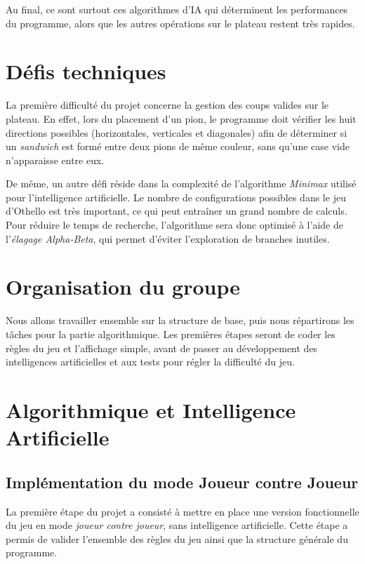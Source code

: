 \documentclass{article}
\begin{document}
Au final, ce sont surtout ces algorithmes d'IA qui déterminent les performances du programme, alors que les autres opérations sur le plateau restent très rapides.

\section{\textbf{Défis techniques}}

La première difficulté du projet concerne la gestion des coups valides sur le plateau. En effet, lors du placement d'un pion, le programme doit vérifier les huit directions possibles (horizontales, verticales et diagonales) afin de déterminer si un \emph{sandwich} est formé entre deux pions de même couleur, sans qu'une case vide n'apparaisse entre eux.

De même, un autre défi réside dans la complexité de l'algorithme \emph{Minimax} utilisé pour l'intelligence artificielle. Le nombre de configurations possibles dans le jeu d'Othello est très important, ce qui peut entraîner un grand nombre de calculs. Pour réduire le temps de recherche, l'algorithme sera donc optimisé à l'aide de l'\emph{élagage Alpha-Beta}, qui permet d'éviter l'exploration de branches inutiles.

\section{\textbf{Organisation du groupe}}

Nous allons travailler ensemble sur la structure de base, puis nous répartirons les tâches pour la partie algorithmique. Les premières étapes seront de coder les règles du jeu et l'affichage simple, avant de passer au développement des intelligences artificielles et aux tests pour régler la difficulté du jeu.

\section{\textbf{Algorithmique et Intelligence Artificielle}}

\subsection{Implémentation du mode Joueur contre Joueur}

La première étape du projet a consisté à mettre en place une version fonctionnelle du jeu en mode \emph{joueur contre joueur}, sans intelligence artificielle. Cette étape a permis de valider l'ensemble des règles du jeu ainsi que la structure générale du programme.
\end{document}

